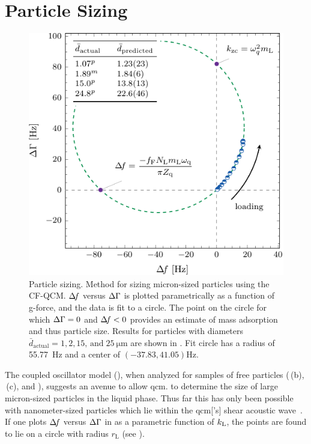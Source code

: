 \section{Particle Sizing}
\begin{figure}[ht]
  \centering
  \includegraphics{qcm/figures/circlefit.pdf}
  \caption{ Particle sizing.  Method for sizing micron-sized particles using the CF-QCM\@.
    $\Delta\!f$ versus $\Delta\Gamma$ is plotted parametrically as a function of g-force, and
    the data is fit to a circle.  The point on the circle for which $\Delta\Gamma=0$ and
    $\Delta\!f<0$ provides an estimate of mass adsorption and thus particle size.
    Results for particles with diameters $\bar{d}_\mathrm{actual}=1, 2,
      15,\,\mathrm{and}\;\SI{25}{\micro\meter}$ are shown in
    .  Fit circle has a radius of \SI{55.77}{\hertz} and
    a center of $(-37.83,41.05) \si{\hertz}$. }
  \label{fig:circlefit}
\end{figure}

The coupled oscillator model (), when analyzed for
samples of free particles (\,(b),
\,(c), and ), suggests an avenue
to allow \gls{qcm}. to determine the size of large micron-sized particles in the
liquid phase.  Thus far this has only been possible with nanometer-sized
particles which lie within the \gls{qcm}['s] shear acoustic
wave~\cite{olsson2013using}.  If one plots $\Delta\!f$ versus $\Delta\Gamma$ in
 as a parametric function of $k_\mathrm{L}$, the points are
found to lie on a circle with radius $r_\mathrm{L}$ (see
).

